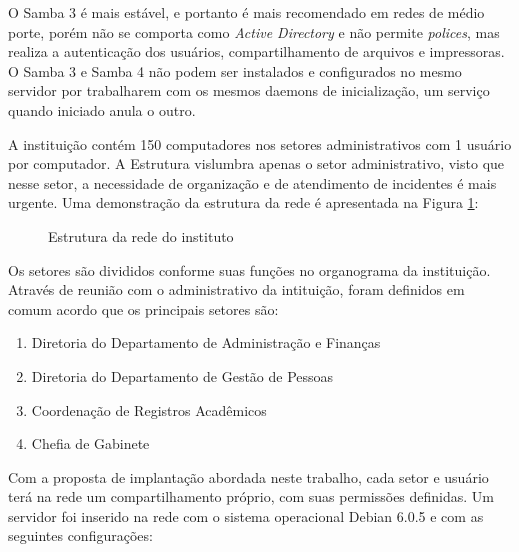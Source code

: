 O Samba 3 é mais estável, e portanto é mais recomendado em redes de médio porte, porém não se comporta como \textit{Active Directory} e não permite \textit{polices}, mas realiza a autenticação dos usuários, compartilhamento de arquivos e impressoras.
O Samba 3 e Samba 4 não podem ser instalados e configurados no mesmo servidor por trabalharem com os mesmos daemons de inicialização, um serviço quando iniciado anula o outro.

A instituição contém 150 computadores nos setores administrativos com 1 usuário por computador. A Estrutura vislumbra apenas o setor administrativo, visto que nesse setor, a necessidade de organização e de atendimento de incidentes é mais urgente. Uma demonstração da estrutura da rede é apresentada na Figura \ref{rede}:

\begin{figure}[h!]
   	\centering
   	\caption{Estrutura da rede do instituto}
    \label{rede}
\end{figure}
          				
Os setores são divididos conforme suas funções no organograma da instituição. Através de reunião com o administrativo da intituição, foram definidos em comum acordo que os principais setores são:

\begin{enumerate}
	\item{Diretoria do Departamento de Administração e Finanças}
	\item{Diretoria do Departamento de Gestão de Pessoas}
	\item{Coordenação de Registros Acadêmicos}
	\item{Chefia de Gabinete}
\end{enumerate}

Com a proposta de implantação abordada neste trabalho, cada setor e usuário terá na rede um compartilhamento próprio, com suas permissões definidas. Um servidor foi inserido na rede com o sistema operacional Debian 6.0.5 e com as seguintes configurações:

